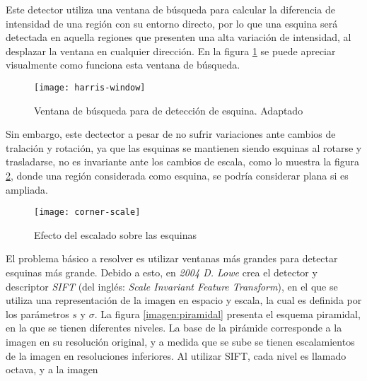 Este detector utiliza una ventana de búsqueda para calcular la diferencia de intensidad de una región con su entorno directo, por lo que una esquina  será detectada en aquella regiones que presenten una alta variación de intensidad, al desplazar la ventana en cualquier dirección. En la figura \ref{imagen:harris-window} se puede apreciar visualmente como funciona esta ventana de búsqueda.

\begin{figure}[H]
	\centering
	\texttt{[image: harris-window]}
	\caption[Ventana de búsqueda para de detección de esquinas]{Ventana de búsqueda para de detección de esquina. Adaptado\protect\footnotemark}
	\label{imagen:harris-window}
\end{figure}

Sin embargo, este dectector a pesar de no sufrir variaciones ante cambios de tralación y rotación, ya que las esquinas se mantienen siendo esquinas al rotarse y trasladarse, no es invariante ante los cambios de escala, como lo muestra la figura \ref{imagen:corner-scale}, donde una región considerada como esquina, se podría considerar plana si es ampliada.


\begin{figure}[H]
	\centering
	\texttt{[image: corner-scale]}
	\caption[Efecto del escalado sobre las esquinas]{Efecto del escalado sobre las esquinas	\protect\footnotemark}
	\label{imagen:corner-scale}
\end{figure}

El problema básico a resolver es utilizar ventanas más grandes para detectar esquinas más grande. Debido a esto, en \textit{2004 D. Lowe} crea el detector y descriptor \textit{SIFT} \cite{sift} (del inglés: \textit{Scale Invariant Feature Transform}), en el que se utiliza una representación de la imagen en espacio y escala, la cual es definida por los parámetros $s$ y $\sigma$. La figura \ref{imagen:piramidal} presenta el esquema piramidal, en la que se tienen diferentes niveles. La base de la pirámide corresponde a la imagen en su resolución original, y a medida que se sube se tienen escalamientos de la imagen en resoluciones inferiores. Al utilizar SIFT, cada nivel es llamado octava, y a la imagen 

